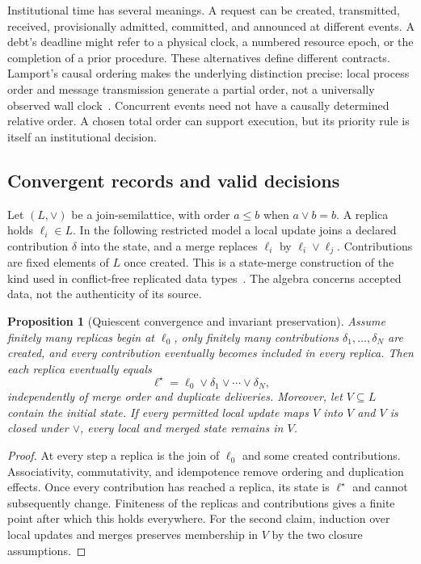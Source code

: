 \documentclass[11pt,letterpaper]{article}
\theoremstyle{plain}
\newtheorem{proposition}{Proposition}[section]
\theoremstyle{definition}
\theoremstyle{remark}
\begin{document}
Institutional time has several meanings. A request can be created, transmitted, received, provisionally admitted, committed, and announced at different events. A debt's deadline might refer to a physical clock, a numbered resource epoch, or the completion of a prior procedure. These alternatives define different contracts. Lamport's causal ordering makes the underlying distinction precise: local process order and message transmission generate a partial order, not a universally observed wall clock~\cite{lamporttime}. Concurrent events need not have a causally determined relative order. A chosen total order can support execution, but its priority rule is itself an institutional decision.

\subsection{Convergent records and valid decisions}
Let $(L,\vee)$ be a join-semilattice, with order $a\leq b$ when $a\vee b=b$. A replica holds $\ell_i\in L$. In the following restricted model a local update joins a declared contribution $\delta$ into the state, and a merge replaces $\ell_i$ by $\ell_i\vee\ell_j$. Contributions are fixed elements of $L$ once created. This is a state-merge construction of the kind used in conflict-free replicated data types~\cite{preguicacrdt}. The algebra concerns accepted data, not the authenticity of its source.

\begin{proposition}[Quiescent convergence and invariant preservation]\label{prop:merge-convergence}
Assume finitely many replicas begin at $\ell_0$, only finitely many contributions $\delta_1,\ldots,\delta_N$ are created, and every contribution eventually becomes included in every replica. Then each replica eventually equals
\[
\ell^\star=\ell_0\vee\delta_1\vee\cdots\vee\delta_N,
\]
independently of merge order and duplicate deliveries. Moreover, let $V\subseteq L$ contain the initial state. If every permitted local update maps $V$ into $V$ and $V$ is closed under $\vee$, every local and merged state remains in $V$.
\end{proposition}
\begin{proof}
At every step a replica is the join of $\ell_0$ and some created contributions. Associativity, commutativity, and idempotence remove ordering and duplication effects. Once every contribution has reached a replica, its state is $\ell^\star$ and cannot subsequently change. Finiteness of the replicas and contributions gives a finite point after which this holds everywhere. For the second claim, induction over local updates and merges preserves membership in $V$ by the two closure assumptions.
\end{proof}
\end{document}
